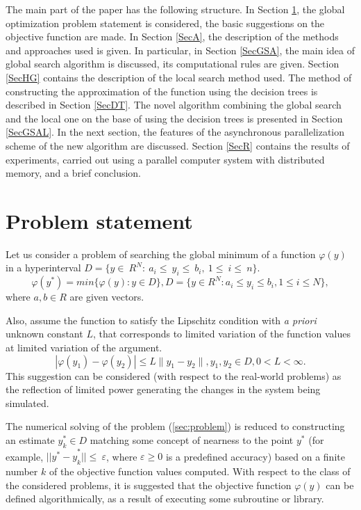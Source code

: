 \documentclass{svproc}
\begin{document}
The main part of the paper has the following structure.  In Section \ref{SecPS}, the global optimization problem statement is considered, the basic suggestions  on the objective function are made. In Section \ref{SecA}, the description of the methods and approaches used is given. In particular, in Section \ref{SecGSA},  the main idea of global search algorithm is discussed, its computational rules are given. Section \ref{SecHG} contains the description of the local search method used. The method of constructing the approximation of the function using the decision trees is described in  Section \ref{SecDT}. The novel algorithm combining the global search and the local one on the base of using the decision  trees is presented in Section \ref{SecGSAL}. In the next section,  the features of the asynchronous parallelization scheme of the new algorithm are discussed. Section \ref{SecR} contains the results of experiments, carried out using a parallel computer system  with distributed memory, and a brief conclusion.


\section{Problem statement}\label{SecPS}

Let us consider a problem of searching the global minimum of a function $\varphi(y)$ in a hyperinterval  $D=\{ y\in\ R^N:\ a_i\le\ y_i\le\ b_i,\ 1\le\ i\le\ n \}$. 
\begin{equation} \label{sec:problem}   
	\varphi(y^*) = min\{\varphi(y):y\in D\}, D = \{y \in R^N : a_i \leq y_i \leq b_i, 1 \leq i \leq N \},
\end{equation}
where $a,b \in R$ are given vectors.

Also, assume the function to satisfy the Lipschitz condition with \textit{a priori} unknown constant $L$, that corresponds to limited variation of the function values at limited variation of the argument.   
\begin{displaymath} 
	|\varphi(y_1)-\varphi(y_2)|\leq L\parallel y_1-y_2 \parallel ,y_1,y_2 \in D, 0<L< \infty. 
\end{displaymath}
This suggestion can be considered (with respect to the real-world problems) as the reflection of limited  power generating the changes in the system being simulated.

The numerical solving of the problem (\ref{sec:problem})  is reduced to constructing an estimate  $ y_k^\ast\in D$ matching some concept of nearness to the point $y^\ast$ (for example,  ${||y^\ast-y}_k^\ast||\le\ \varepsilon$, where $\varepsilon\geq0$ is a predefined accuracy) based on a  finite number $k$ of the objective function values computed. With respect to the class of the considered problems, it is suggested that the objective function $\varphi(y)$ can be defined algorithmically, as a result of executing some subroutine or library.
\end{document}
